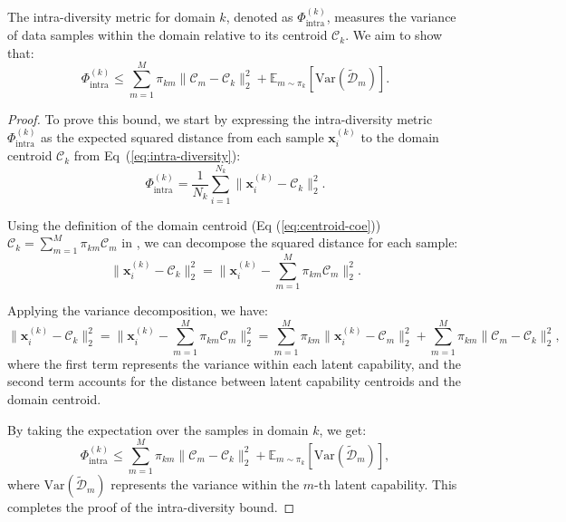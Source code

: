 The intra-diversity metric for domain \(k\), denoted as \(\Phi_{\text{intra}}^{(k)}\), measures the variance of data samples within the domain relative to its centroid \(\mathcal{C}_k\). We aim to show that:
\begin{equation}
    \Phi_{\text{intra}}^{(k)} \leq \sum_{m=1}^M \pi_{km} \|\mathcal{C}_m - \mathcal{C}_k\|_2^2 + \mathbb{E}_{m\sim\pi_k}[\text{Var}(\tilde{\mathcal{D}}_m)].
\end{equation}

\begin{proof}
To prove this bound, we start by expressing the intra-diversity metric \(\Phi_{\text{intra}}^{(k)}\) as the expected squared distance from each sample \(\mathbf{x}_i^{(k)}\) to the domain centroid \(\mathcal{C}_k\) from Eq~(\ref{eq:intra-diversity}):
\begin{equation}
    \Phi_{\text{intra}}^{(k)} = \frac{1}{N_k} \sum_{i=1}^{N_k} \|\mathbf{x}_i^{(k)} - \mathcal{C}_k\|_2^2.
\end{equation}

Using the definition of the domain centroid (Eq (\ref{eq:centroid-coe})) \(\mathcal{C}_k = \sum_{m=1}^M \pi_{km} \mathcal{C}_m\) in , we can decompose the squared distance for each sample:
\begin{equation}
    \|\mathbf{x}_i^{(k)} - \mathcal{C}_k\|_2^2 = \|\mathbf{x}_i^{(k)} - \sum_{m=1}^M \pi_{km} \mathcal{C}_m\|_2^2.
\end{equation}

Applying the variance decomposition, we have:
\begin{equation}
    \|\mathbf{x}_i^{(k)} - \mathcal{C}_k\|_2^2 = \|\mathbf{x}_i^{(k)} - \sum_{m=1}^M \pi_{km} \mathcal{C}_m\|_2^2 = \sum_{m=1}^M \pi_{km} \|\mathbf{x}_i^{(k)} - \mathcal{C}_m\|_2^2 + \sum_{m=1}^M \pi_{km} \|\mathcal{C}_m - \mathcal{C}_k\|_2^2,
\end{equation}
where the first term represents the variance within each latent capability, and the second term accounts for the distance between latent capability centroids and the domain centroid.

By taking the expectation over the samples in domain \(k\), we get:
\begin{equation}
    \Phi_{\text{intra}}^{(k)} \leq \sum_{m=1}^M \pi_{km} \|\mathcal{C}_m - \mathcal{C}_k\|_2^2 + \mathbb{E}_{m\sim\pi_k}[\text{Var}(\tilde{\mathcal{D}}_m)],
\end{equation}
where \(\text{Var}(\tilde{\mathcal{D}}_m)\) represents the variance within the \(m\)-th latent capability. This completes the proof of the intra-diversity bound.
\end{proof}



